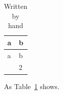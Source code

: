 \begin{longtable}[]{@{}ll@{}}
\caption{Written by hand}\label{tblHand}\tabularnewline
\toprule\noalign{}
a & b \\
\midrule\noalign{}
\endfirsthead
\toprule\noalign{}
a & b \\
\midrule\noalign{}
\endhead
\bottomrule\noalign{}
\endlastfoot
1 & 2 \\
\end{longtable}

As Table~\ref{tblHand} shows.
